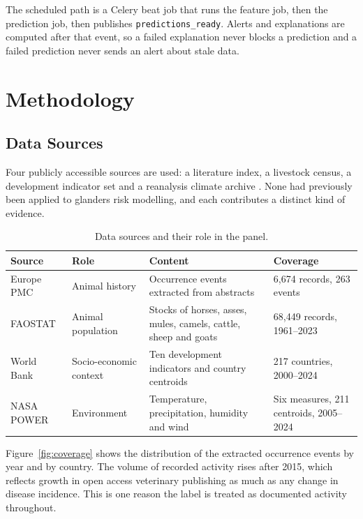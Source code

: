 \documentclass[10pt,openany]{report}
\begin{document}
The scheduled path is a Celery beat job that runs the feature job, then the prediction job, then
publishes \texttt{predictions\_ready}. Alerts and explanations are computed after that event, so a
failed explanation never blocks a prediction and a failed prediction never sends an alert about
stale data.

\chapter{Methodology}
\label{ch:method}

\section{Data Sources}

Four publicly accessible sources are used: a literature index, a livestock census, a development
indicator set and a reanalysis climate archive \cite{europepmc,faostat,wdi,power}. None had
previously been applied to glanders risk modelling, and each contributes a distinct kind of
evidence.

\begin{table}[htbp]
\centering
\caption{Data sources and their role in the panel.}
\label{tab:sources}
\small
\begin{tabular}{@{}p{2.9cm}p{2.7cm}p{4.3cm}p{3.4cm}@{}}
\toprule
\textbf{Source} & \textbf{Role} & \textbf{Content} & \textbf{Coverage} \\
\midrule
Europe PMC & Animal history & Occurrence events extracted from abstracts & 6,674 records, 263 events \\
FAOSTAT & Animal population & Stocks of horses, asses, mules, camels, cattle, sheep and goats & 68,449 records, 1961--2023 \\
World Bank & Socio-economic context & Ten development indicators and country centroids & 217 countries, 2000--2024 \\
NASA POWER & Environment & Temperature, precipitation, humidity and wind & Six measures, 211 centroids, 2005--2024 \\
\bottomrule
\end{tabular}
\end{table}

Figure~\ref{fig:coverage} shows the distribution of the extracted occurrence events by year and
by country. The volume of recorded activity rises after 2015, which reflects growth in open
access veterinary publishing as much as any change in disease incidence. This is one reason the
label is treated as documented activity throughout.
\end{document}
